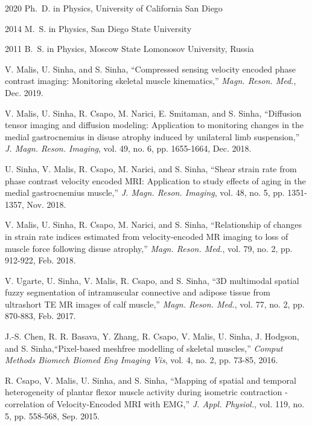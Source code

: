 \begin{frontmatter}
%
%
\begin{vitapage}
\begin{vita}
  \item[2020] Ph.~D. in Physics, University of California San Diego
  \item[2014] M.~S. in Physics, San Diego State University
  \item[2011] B.~S. in Physics, Moscow State Lomonosov University, Russia
  \end{vita}
\begin{publications}
  \item   V. Malis, U. Sinha, and S. Sinha, ``Compressed sensing velocity encoded phase contrast imaging: Monitoring skeletal muscle kinematics,'' \emph{Magn. Reson. Med.}, Dec. 2019.
  \item V. Malis, U. Sinha, R. Csapo, M. Narici, E. Smitaman, and S. Sinha, ``Diffusion tensor imaging and diffusion modeling: Application to monitoring changes in the medial gastrocnemius in disuse atrophy induced by unilateral limb suspension,'' \emph{J. Magn. Reson. Imaging}, vol. 49, no. 6, pp. 1655-1664, Dec. 2018.
  \item U. Sinha, V. Malis, R. Csapo, M. Narici, and S. Sinha, ``Shear strain rate from phase contrast velocity encoded MRI: Application to study effects of aging in the medial gastrocnemius muscle,'' \emph{J. Magn. Reson. Imaging}, vol. 48, no. 5, pp. 1351-1357, Nov. 2018.
  \item	V. Malis, U. Sinha, R. Csapo, M. Narici, and S. Sinha, ``Relationship of changes in strain rate indices estimated from velocity-encoded MR imaging to loss of muscle force following disuse atrophy,'' \emph{Magn. Reson. Med.}, vol. 79, no. 2, pp. 912-922, Feb. 2018.
  \item	V. Ugarte, U. Sinha, V. Malis, R. Csapo, and S. Sinha, ``3D multimodal spatial fuzzy segmentation of intramuscular connective and adipose tissue from ultrashort TE MR images of calf muscle,'' \emph{Magn. Reson. Med.}, vol. 77, no. 2, pp. 870-883, Feb. 2017.
  \item	J.-S. Chen, R. R. Basava, Y. Zhang, R. Csapo, V. Malis, U. Sinha, J. Hodgson, and S. Sinha,``Pixel-based meshfree modelling of skeletal muscles,'' \emph{Comput Methods Biomech Biomed Eng Imaging Vis}, vol. 4, no. 2, pp. 73-85, 2016.
  \item	R. Csapo, V. Malis, U. Sinha, and S. Sinha, ``Mapping of spatial and temporal heterogeneity of plantar flexor muscle activity during isometric contraction - correlation of Velocity-Encoded MRI with EMG,'' \emph{J. Appl. Physiol.}, vol. 119, no. 5, pp. 558-568, Sep. 2015.

\end{publications}
\end{vitapage}
\end{frontmatter}
